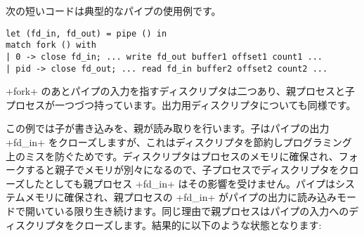 \begin{example} %
次の短いコードは典型的なパイプの使用例です。
%
\begin{lstlisting}
let (fd_in, fd_out) = pipe () in
match fork () with
| 0 -> close fd_in; ... write fd_out buffer1 offset1 count1 ...
| pid -> close fd_out; ... read fd_in buffer2 offset2 count2 ...
\end{lstlisting}
%
\ml+fork+ のあとパイプの入力を指すディスクリプタは二つあり、親プロセスと子プロセスが一つづつ持っています。出力用ディスクリプタについても同様です。
%
\begin{myimage}[width="45\%"]
\end{myimage}
%
この例では子が書き込みを、親が読み取りを行います。子はパイプの出力 \ml+fd_in+ をクローズしますが、これはディスクリプタを節約しプログラミング上のミスを防ぐためです。ディスクリプタはプロセスのメモリに確保され、フォークすると親子でメモリが別々になるので、子プロセスでディスクリプタをクローズしたとしても親プロセス \ml+fd_in+ はその影響を受けません。パイプはシステムメモリに確保され、親プロセスの \ml+fd_in+ がパイプの出力に読み込みモードで開いている限り生き続けます。同じ理由で親プロセスはパイプの入力へのディスクリプタをクローズします。結果的に以下のような状態となります:


\end{example}
